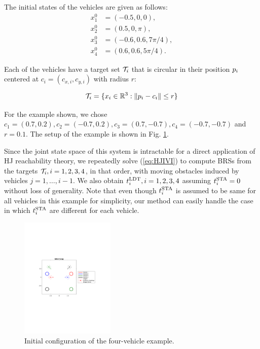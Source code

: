 The initial states of the vehicles are given as follows:
\begin{equation}
\begin{aligned}
x_1^0 &= (-0.5, 0, 0), \\
x_2^0 &= (0.5, 0, \pi), \\
x_3^0 &= \left(-0.6, 0.6, 7\pi/4\right), \\
x_4^0 &= \left(0.6, 0.6, 5\pi/4\right).\
\end{aligned}
\end{equation}

\noindent Each of the vehicles have a target set $\mathcal{T}_i$ that is circular in their position $p_i$ centered at $c_i = (c_{x,i}, c_{y,i})$ with radius $r$:

\begin{equation}
\mathcal{T}_i = \{x_i \in \mathbb{R}^3: \|p_i - c_i\| \le r\}
\end{equation}

\noindent For the example shown, we chose $c_1 = (0.7, 0.2), c_2 = (-0.7, 0.2), c_3 = (0.7, -0.7), c_4 = (-0.7, -0.7)$ and $r = 0.1$. The setup of the example is shown in Fig. \ref{fig:init_setup}.

Since the joint state space of this system is intractable for a direct application of HJ reachability theory, we repeatedly solve (\ref{eq:HJIVI}) to compute BRSs from the targets $\mathcal{T}_i, i =1,2,3,4$, in that order, with moving obstacles induced by vehicles $j=1,\ldots,i-1$. We also obtain $t^\text{LDT}_i, i=1,2,3,4$ assuming $t^\text{STA}_i=0$ without loss of generality. Note that even though $t^\text{STA}_i$ is assumed to be same for all vehicles in this example for simplicity, our method can easily handle the case in which $t^\text{STA}_i$ are different for each vehicle.

\begin{figure}
  \centering
  \includegraphics[width=0.4\textwidth]{"fig/init_setup"}
  \caption{Initial configuration of the four-vehicle example.}
  \label{fig:init_setup}
\end{figure}

